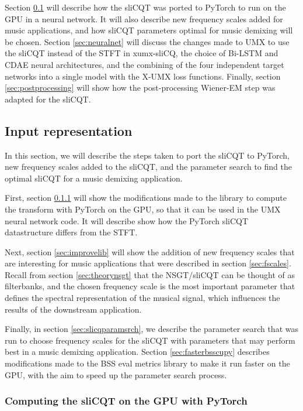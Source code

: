\documentclass[report.tex]{subfiles}
\begin{document}
Section \ref{sec:inputrepresentation} will describe how the sliCQT was ported to PyTorch to run on the GPU in a neural network. It will also describe new frequency scales added for music applications, and how sliCQT parameters optimal for music demixing will be chosen. Section \ref{sec:neuralnet} will discuss the changes made to UMX to use the sliCQT instead of the STFT in xumx-sliCQ, the choice of Bi-LSTM and CDAE neural architectures, and the combining of the four independent target networks into a single model with the X-UMX loss functions. Finally, section \ref{sec:postprocessing} will show how the post-processing Wiener-EM step was adapted for the sliCQT.

\subsection{Input representation}
\label{sec:inputrepresentation}

In this section, we will describe the steps taken to port the sliCQT to PyTorch, new frequency scales added to the sliCQT, and the parameter search to find the optimal sliCQT for a music demixing application.

First, section \ref{sec:torchslicq} will show the modifications made to the library to compute the transform with PyTorch on the GPU, so that it can be used in the UMX neural network code. It will describe show how the PyTorch sliCQT datastructure differs from the STFT.

Next, section \ref{sec:improvelib} will show the addition of new frequency scales that are interesting for music applications that were described in section \ref{sec:fscales}. Recall from section \ref{sec:theorynsgt} that the NSGT/sliCQT can be thought of as filterbanks, and the chosen frequency scale is the most important parameter that defines the spectral representation of the musical signal, which influences the results of the downstream application.

Finally, in section \ref{sec:slicqparamsrch}, we describe the parameter search that was run to choose frequency scales for the sliCQT with parameters that may perform best in a music demixing application. Section \ref{sec:fasterbsscupy} describes modifications made to the BSS eval metrics library to make it run faster on the GPU, with the aim to speed up the parameter search process.

\subsubsection{Computing the sliCQT on the GPU with PyTorch}
\label{sec:torchslicq}
\end{document}
